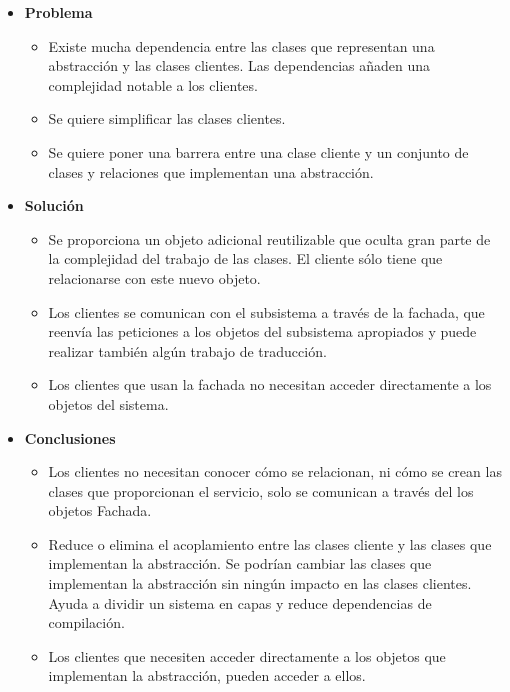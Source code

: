 \begin{itemize}
\item \textbf{Problema}

\begin{itemize}
\item Existe mucha dependencia entre las clases que representan una abstracción y las clases clientes. Las dependencias añaden una complejidad notable a los clientes.
\item Se quiere simplificar las clases clientes.
\item Se quiere poner una barrera entre una clase cliente y un conjunto de clases y relaciones que implementan una abstracción.
\end{itemize}

\item \textbf{Solución}

\begin{itemize}
\item Se proporciona un objeto adicional reutilizable que oculta gran parte de la complejidad del trabajo de las clases. El cliente sólo tiene que relacionarse con este nuevo objeto.
\item Los clientes se comunican con el subsistema a través de la fachada, que reenvía las peticiones a los objetos del subsistema apropiados y puede realizar también algún trabajo de traducción.
\item Los clientes que usan la fachada no necesitan acceder directamente a los objetos del sistema.
\end{itemize}

\item \textbf{Conclusiones}

\begin{itemize}
\item Los clientes no necesitan conocer cómo se relacionan, ni cómo se crean las clases que proporcionan el servicio, solo se comunican a través del los objetos Fachada.
\item Reduce o elimina el acoplamiento entre las clases cliente y las clases que implementan la abstracción. Se podrían cambiar las clases que implementan la abstracción sin ningún impacto en las clases clientes. Ayuda a dividir un sistema en capas y reduce dependencias de compilación.
\item Los clientes que necesiten acceder directamente a los objetos que implementan la abstracción, pueden acceder a ellos.
\end{itemize}
\end{itemize}

